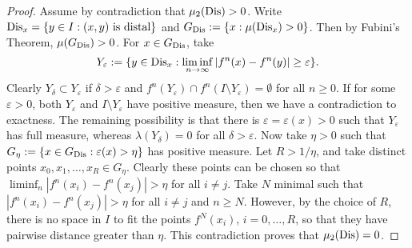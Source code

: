 \documentclass[12pt, psamsfonts, reqno]{amsart}
\begin{document}
\begin{proof}
 Assume by contradiction that $\mu_2({\mathop{\rm Dis}\nolimits}) > 0$. Write ${\mathop{\rm Dis}\nolimits}_x =
 \{ y \in I : (x,y) \text{ is distal}\}$ and $G_{\mathop{\rm Dis}\nolimits} := \{ x :
 \mu({\mathop{\rm Dis}\nolimits}_x) > 0\}$. Then by Fubini's Theorem,
 $\mu(G_{\mathop{\rm Dis}\nolimits}) > 0$. For $x \in G_{\mathop{\rm Dis}\nolimits}$, take
 $$
  Y_{\varepsilon} := \{ y \in {\mathop{\rm Dis}\nolimits}_x : \liminf_{n\to\infty} |f^n(x)-f^n(y)| \geq  {\varepsilon}\}.
 $$
 Clearly $Y_\delta \subset Y_{\varepsilon}$ if $\delta > {\varepsilon}$ and
 $f^n(Y_{\varepsilon}) \cap f^n(I \setminus Y_{\varepsilon}) = \emptyset$ for all $n
 \geq 0$. If for some ${\varepsilon} > 0$, both $Y_{\varepsilon}$ and $I \setminus
 Y_{\varepsilon}$ have positive measure, then we have a contradiction to
 exactness. The remaining possibility is that there is
 ${\varepsilon} = {\varepsilon}(x) > 0$ such that $Y_{\varepsilon}$ has full measure, whereas
 $\lambda(Y_\delta) = 0$ for all $\delta > {\varepsilon}$. Now take $\eta >
 0$ such that $G_\eta := \{ x \in G_{\mathop{\rm Dis}\nolimits} : {\varepsilon}(x) > \eta\}$
 has positive measure. Let $R > 1/\eta$, and take distinct
 points $x_0,x_1, \dots, x_R \in G_\eta$. Clearly these points can be chosen
 so that $\liminf_n  |f^n(x_i)-f^n(x_j)|>\eta$
 for all $i \neq j$. Take $N$ minimal such that $|f^n(x_i)-
 f^n(x_j)|> \eta$ for all $i \neq j$ and $n \geq N$. However, by
 the choice of $R$, there is no space in $I$ to fit the points
 $f^N(x_i)$, $i=0,\dots, R$, so that they have pairwise
 distance greater than $\eta$. This contradiction proves that $\mu_2({\mathop{\rm Dis}\nolimits})
 = 0$.
\end{proof}
\end{document}
